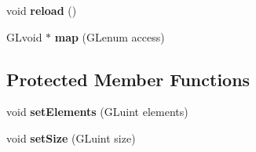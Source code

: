 \begin{DoxyCompactItemize}
\item 
\hypertarget{classfillwave_1_1core_1_1Buffer_afcd11fbdf69f3056ecfcd00cfe2f3966}{}void {\bfseries reload} ()\label{classfillwave_1_1core_1_1Buffer_afcd11fbdf69f3056ecfcd00cfe2f3966}

\item 
\hypertarget{classfillwave_1_1core_1_1Buffer_a15b15840d557ab784ca8258d53e4dc28}{}G\+Lvoid $\ast$ {\bfseries map} (G\+Lenum access)\label{classfillwave_1_1core_1_1Buffer_a15b15840d557ab784ca8258d53e4dc28}

\end{DoxyCompactItemize}
\subsection*{Protected Member Functions}
\begin{DoxyCompactItemize}
\item 
\hypertarget{classfillwave_1_1core_1_1Buffer_a470d1b51f2b2d2d6d8a5dce29358c1f9}{}void {\bfseries set\+Elements} (G\+Luint elements)\label{classfillwave_1_1core_1_1Buffer_a470d1b51f2b2d2d6d8a5dce29358c1f9}

\item 
\hypertarget{classfillwave_1_1core_1_1Buffer_a890a440f8ea28e984a9bdfa7949ef427}{}void {\bfseries set\+Size} (G\+Luint size)\label{classfillwave_1_1core_1_1Buffer_a890a440f8ea28e984a9bdfa7949ef427}

\end{DoxyCompactItemize}
